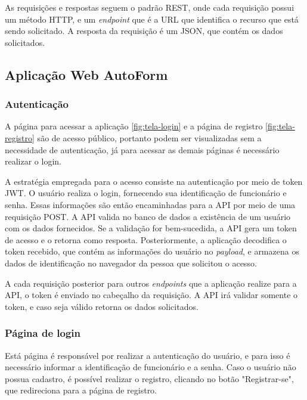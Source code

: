 As requisições e respostas seguem o padrão REST, onde cada requisição possui um método HTTP, e um \textit{endpoint} que é a URL que identifica o recurso que está sendo solicitado. A resposta da requisição é um JSON, que contém os dados solicitados.



\subsection{Aplicação Web AutoForm}

\subsubsection{Autenticação}

A página para acessar a aplicação \autoref{fig:tela-login} e a página de registro \autoref{fig:tela-registro} são de acesso público, portanto podem ser visualizadas sem a necessidade de autenticação, já para acessar as demais páginas é necessário realizar o login.

A estratégia empregada para o acesso consiste na autenticação por meio de token JWT. O usuário realiza o login, fornecendo sua identificação de funcionário e senha. Essas informações são então encaminhadas para a API por meio de uma requisição POST. 
A API valida no banco de dados a existência de um usuário com os dados fornecidos. 
Se a validação for bem-sucedida, a API gera um token de acesso e o retorna como resposta. Posteriormente, a aplicação decodifica o token recebido, que contém as informações do usuário no \textit{payload}, e armazena os dados de identificação no navegador da pessoa que solicitou o acesso.

A cada requisição posterior para outros \textit{endpoints} que a aplicação realize para a API, o token é enviado no cabeçalho da requisição. A API irá validar somente o token, e caso seja válido retorna os dados solicitados.

\subsubsection{Página de login}
Está página é responsável por realizar a autenticação do usuário, e para isso é necessário informar a identificação de funcionário e a senha. Caso o usuário não possua cadastro, é possível realizar o registro, clicando no botão "Registrar-se", que redireciona para a página de registro.

